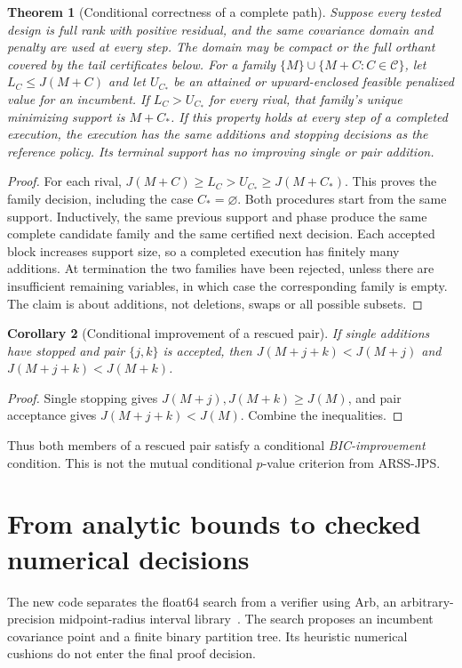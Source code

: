 \documentclass[11pt,a4paper]{article}
\newtheorem{theorem}{Theorem}
\newtheorem{corollary}[theorem]{Corollary}
\theoremstyle{remark}\newtheorem{remark}[theorem]{Remark}
\newcommand{\calC}{\mathcal C}
\begin{document}
\begin{theorem}[Conditional correctness of a complete path]\label{thm:path}
Suppose every tested design is full rank with positive residual, and the same
covariance domain and penalty are used at every step. The domain may be compact
or the full orthant covered by the tail certificates below. For a family
$\{M\}\cup\{M+C:C\in\calC\}$, let $L_C\leq J(M+C)$ and let $U_{C_*}$ be
an attained or upward-enclosed feasible penalized value for an incumbent.
If $L_C>U_{C_*}$ for every rival, that family's unique minimizing support is
$M+C_*$. If this property holds at every step of a completed execution, the
execution has the same additions and stopping decisions as the reference policy.
Its terminal support has no improving single or pair addition.
\end{theorem}
\begin{proof}
For each rival, $J(M+C)\geq L_C>U_{C_*}\geq J(M+C_*)$.
This proves the family decision, including the case $C_*=\varnothing$.
Both procedures start from the same support. Inductively, the same previous
support and phase produce the same complete candidate family and the same
certified next decision. Each accepted block increases support size, so a
completed execution has finitely many additions. At termination the two families
have been rejected, unless there are insufficient remaining variables, in which
case the corresponding family is empty. The claim is about additions, not
deletions, swaps or all possible subsets.
\end{proof}

\begin{corollary}[Conditional improvement of a rescued pair]
If single additions have stopped and pair $\{j,k\}$ is accepted, then
$J(M+j+k)<J(M+j)$ and $J(M+j+k)<J(M+k)$.
\end{corollary}
\begin{proof}
Single stopping gives $J(M+j),J(M+k)\geq J(M)$, and pair acceptance gives
$J(M+j+k)<J(M)$. Combine the inequalities.
\end{proof}
Thus both members of a rescued pair satisfy a conditional \emph{BIC-improvement}
condition. This is not the mutual conditional $p$-value criterion from ARSS-JPS.

\section{From analytic bounds to checked numerical decisions}
The new code separates the float64 search from a verifier using Arb, an
arbitrary-precision midpoint-radius interval library~\cite{arb}. The search
proposes an incumbent covariance point and a finite binary partition tree.
Its heuristic numerical cushions do not enter the final proof decision.
\end{document}
